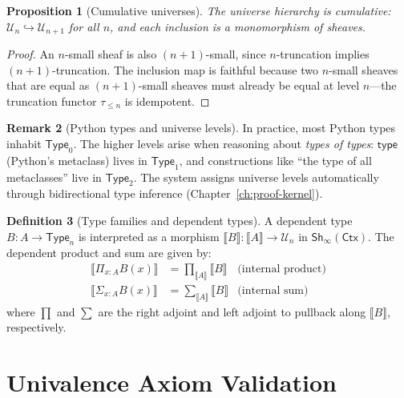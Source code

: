 \documentclass[11pt,a4paper]{report}
\theoremstyle{definition}
\newtheorem{definition}{Definition}[chapter]
\newtheorem{remark}[definition]{Remark}
\theoremstyle{plain}
\newtheorem{proposition}[definition]{Proposition}
\newcommand{\den}[1]{\llbracket #1 \rrbracket}
\newcommand{\Type}{\mathsf{Type}}
\newcommand{\Ctx}{\mathsf{Ctx}}
\newcommand{\Sh}{\mathsf{Sh}}
\begin{document}
\begin{proposition}[Cumulative universes]
\label{prop:cumul-univ}
The universe hierarchy is cumulative: $\mathcal{U}_n \hookrightarrow \mathcal{U}_{n+1}$
for all $n$, and each inclusion is a monomorphism of sheaves.
\end{proposition}
\begin{proof}
An $n$-small sheaf is also $(n{+}1)$-small, since $n$-truncation implies
$(n{+}1)$-truncation.  The inclusion map is faithful because two $n$-small
sheaves that are equal as $(n{+}1)$-small sheaves must already be equal at
level $n$---the truncation functor $\tau_{\leq n}$ is idempotent.
\end{proof}

\begin{remark}[Python types and universe levels]
In practice, most Python types inhabit $\Type_0$.  The higher levels arise when
reasoning about \emph{types of types}: $\mathsf{type}$ (Python's metaclass) lives
in $\Type_1$, and constructions like ``the type of all metaclasses'' live in
$\Type_2$.  The system assigns universe levels automatically through
bidirectional type inference (Chapter~\ref{ch:proof-kernel}).
\end{remark}

\begin{definition}[Type families and dependent types]
A dependent type $B : A \to \Type_n$ is interpreted as a morphism
$\den{B} : \den{A} \to \mathcal{U}_n$ in $\Sh_\infty(\Ctx)$.  The dependent
product and sum are given by:
\begin{align}
  \den{\Pi_{x:A} B(x)} &= \prod_{\den{A}} \den{B} & \text{(internal product)} \\
  \den{\Sigma_{x:A} B(x)} &= \sum_{\den{A}} \den{B} & \text{(internal sum)}
\end{align}
where $\prod$ and $\sum$ are the right adjoint and left adjoint to pullback
along $\den{B}$, respectively.
\end{definition}


\section{Univalence Axiom Validation}
\end{document}
